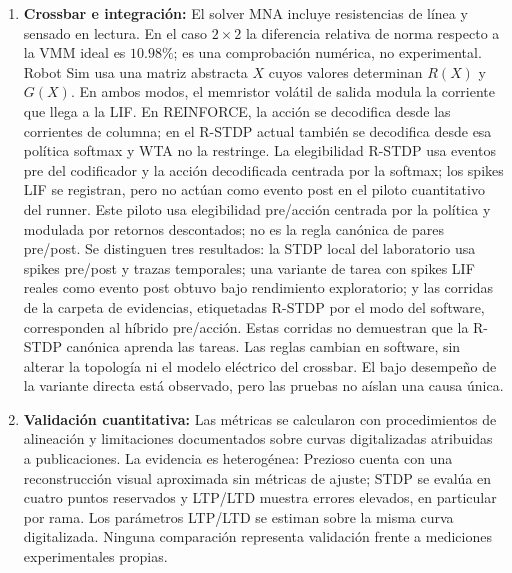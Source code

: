 \begin{enumerate}
pruebas funcionales verifican partes de su mecanismo. La carpeta de evidencias
incluye un piloto exploratorio de 28 corridas en CartPole, visi\'on y obst\'aculos
(dos semillas y dos valores de $X_0$), adem\'as de cuatro corridas R-STDP de Car
bajo un protocolo inicial. Una repetici\'on separada de Car R-STDP con
evaluaci\'on cada 100 episodios us\'o semillas 2 y 4. La muestra sigue siendo
peque\~na, Car REINFORCE no est\'a emparejado en estos lotes y el protocolo Car
inicial difiere; no se afirma superioridad estad\'istica ni se generaliza a
otras condiciones.
    \item \textbf{Crossbar e integración:} El solver MNA incluye resistencias
    de línea y sensado en lectura. En el caso $2\times2$ la diferencia
    relativa de norma respecto a la VMM ideal es $10.98\%$; es una
    comprobación numérica, no experimental. Robot Sim usa una matriz
    abstracta $X$ cuyos valores determinan $R(X)$ y $G(X)$. En ambos modos, el memristor vol\'atil de salida modula la corriente
    que llega a la LIF. En REINFORCE, la acci\'on se decodifica desde las
    corrientes de columna; en el R-STDP actual tambi\'en se decodifica desde
    esa pol\'itica softmax y WTA no la restringe. La elegibilidad R-STDP usa
    eventos pre del codificador y la acci\'on decodificada centrada por la
    softmax; los spikes LIF se registran, pero no act\'uan como evento post
    en el piloto cuantitativo del runner. Este piloto usa elegibilidad
    pre/acci\'on centrada por la pol\'itica y modulada por retornos descontados;
    no es la regla can\'onica de pares pre/post. Se distinguen tres resultados:
    la STDP local del laboratorio usa spikes pre/post y trazas temporales;
    una variante de tarea con spikes LIF reales como evento post obtuvo bajo
    rendimiento exploratorio; y las corridas de la carpeta de evidencias,
    etiquetadas R-STDP por el modo del software, corresponden al h\'ibrido
    pre/acci\'on. Estas corridas no demuestran que la R-STDP can\'onica
    aprenda las tareas. Las reglas cambian en software, sin alterar la
    topolog\'ia ni el modelo el\'ectrico del crossbar. El bajo desempe\~no de
    la variante directa est\'a observado, pero las pruebas no aíslan una causa
    \'unica.
    \item \textbf{Validación cuantitativa:} Las métricas se calcularon con
    procedimientos de alineación y limitaciones documentados sobre curvas
    digitalizadas atribuidas a publicaciones. La evidencia es heterogénea:
    Prezioso cuenta con una reconstrucción visual aproximada sin métricas
    de ajuste; STDP se evalúa en cuatro puntos reservados y LTP/LTD muestra
    errores elevados, en particular por rama. Los parámetros LTP/LTD se
    estiman sobre la misma curva digitalizada. Ninguna comparación
    representa validación frente a mediciones experimentales propias.
\end{enumerate}

